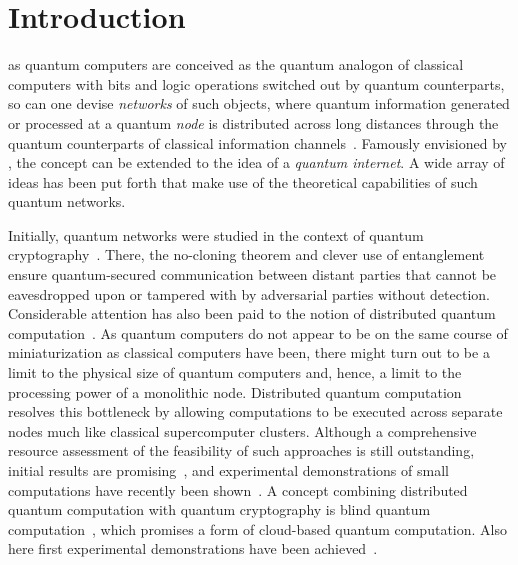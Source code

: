 \chapter{Introduction}\label{ch:exp:introduction}
 as quantum computers are conceived as the quantum analogon of classical computers with bits and logic operations switched out by quantum counterparts, so can one devise \emph{networks} of such objects, where quantum information generated or processed at a quantum \emph{node} is distributed across long distances through the quantum counterparts of classical information channels~\cite{Nielsen2011,Simon2017}.
Famously envisioned by \citet{Kimble2008}, the concept can be extended to the idea of a \emph{quantum internet}.
A wide array of ideas has been put forth that make use of the theoretical capabilities of such quantum networks.

Initially, quantum networks were studied in the context of quantum cryptography~\cite{Bennett1984,Ekert1991,Deutsch1996,Gisin2002}.
There, the no-cloning theorem and clever use of entanglement ensure quantum-secured communication between distant parties that cannot be eavesdropped upon or tampered with by adversarial parties without detection.
Considerable attention has also been paid to the notion of distributed quantum computation~\cite{Cirac1999}.
As quantum computers do not appear to be on the same course of miniaturization as classical computers have been, there might turn out to be a limit to the physical size of quantum computers and, hence, a limit to the processing power of a monolithic node.
Distributed quantum computation resolves this bottleneck by allowing computations to be executed across separate nodes much like classical supercomputer clusters.
Although a comprehensive resource assessment of the feasibility of such approaches is still outstanding, initial results are promising~\cite{Jacinto2025}, and experimental demonstrations of small computations have recently been shown~\cite{Main2025}.
A concept combining distributed quantum computation with quantum cryptography is blind quantum computation~\cite{Childs2005,Giovannetti2013}, which promises a form of cloud-based quantum computation.
Also here first experimental demonstrations have been achieved~\cite{Wei2025}.

